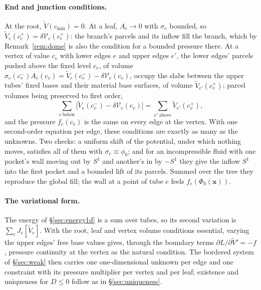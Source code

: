 \documentclass[11pt]{article}
\theoremstyle{definition}
\theoremstyle{remark}
\newcommand{\bx}{\mathbf{x}}
\newcommand{\Vol}{\mathcal V}
\newcommand{\Vt}{\tilde V}
\begin{document}
\paragraph{End and junction conditions.} At the root, $\Vt(c_{\min}) =
0$. At a leaf, $A_e \to 0$ with $\sigma_e$ bounded, so $\Vt_e(c_e^+) =
\delta\Vol_e(c_e^+)$: the branch's parcels and its inflow fill the
branch, which by Remark~\ref{rem:dome} is also the condition for a
bounded pressure there. At a vertex of value $c_v$ with lower edges $e$
and upper edges $e'$, the lower edges' parcels pushed above the fixed
level $c_v$, of volume $\sigma_e(c_v^-)A_e(c_v) = \Vt_e(c_v^-) -
\delta\Vol_e(c_v)$, occupy the slabs between the upper tubes' fixed
bases and their material base surfaces, of volume $\Vt_{e'}(c_v^+)$;
parcel volumes being preserved to first order,
\begin{equation}
  \sum_{e\ \text{below}}\bigl[\Vt_e(c_v^-) - \delta\Vol_e(c_v)\bigr]
  = \sum_{e'\ \text{above}}\Vt_{e'}(c_v^+) ,
  \label{eq:vertex}
\end{equation}
and the pressure $f_e(c_v)$ is the same on every edge at the vertex.
With one second-order equation per edge, these conditions are exactly
as many as the unknowns. Two checks: a uniform shift of the potential,
under which nothing moves, satisfies all of them with $\sigma_e \equiv
\phi_0$; and for an incompressible fluid with one pocket's wall moving
out by $S^1$ and another's in by $-S^1$ they give the inflow $S^1$ into
the first pocket and a bounded lift of its parcels. Summed over the
tree they reproduce the global fill; the wall at a point of tube $e$
feels $f_e(\Phi_0(\bx))$.

\paragraph{The variational form.} The energy of \S\ref{sec:energy1d} is
a sum over tubes, so its second variation is $\sum_eJ_e[\Vt_e]$. With
the root, leaf and vertex volume conditions essential, varying the
upper edges' free base values gives, through the boundary terms
$\partial L/\partial\Vt' = -f$, pressure continuity at the vertex as
the natural condition. The bordered system of \S\ref{sec:weak} then
carries one one-dimensional unknown per edge and one constraint with
its pressure multiplier per vertex and per leaf; existence and
uniqueness for $D \le 0$ follow as in \S\ref{sec:uniqueness}.
\end{document}
